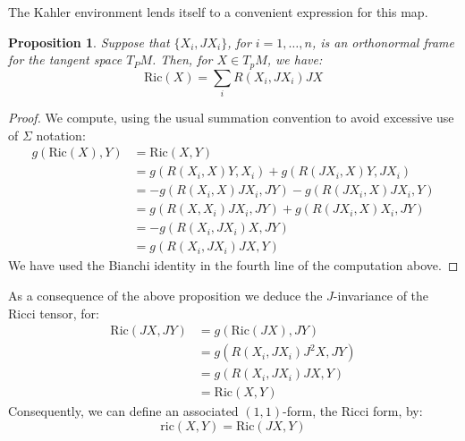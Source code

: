 \documentclass[11pt]{amsart}
\newtheorem{prop}[subsection]{Proposition}
\theoremstyle{definition}
\def \Ric{ \text{Ric} }
\def \ric{ \text{ric} }
\begin{document}
The Kahler environment lends itself to a convenient expression for this map.
%
\begin{prop} Suppose that $\{X_i, JX_i\}$, for $i=1,\ldots,n$, is an orthonormal frame for the tangent space $T_P M$.  Then, for $X \in T_p M$, we have:
$$ \Ric (X) = \sum_i R(X_i, JX_i) JX $$
\end{prop}
%
\begin{proof}
We compute, using the usual summation convention to avoid excessive use of $\Sigma$ notation:
%
\begin{align*}
g( \Ric(X), Y ) &= \Ric(X,Y) \\
&= g( R ( X_i, X ) Y, X_i ) + g( R ( J X_i, X ) Y, J X_i ) \\
&= - g( R( X_i, X ) J X_i, J Y ) - g( R( J X_i, X )J X_i, Y ) \\
&= g( R( X, X_i ) J X_i, J Y ) + g( R( J X_i, X ) X_i, JY ) \\
&= - g( R( X_i, J X_i ) X, JY ) \\
&= g( R( X_i, J X_i ) JX, Y )
\end{align*}
%
We have used the Bianchi identity in the fourth line of the computation above. 
%
\end{proof}
%
As a consequence of the above proposition we deduce the $J$-invariance of the Ricci tensor, for:
%
\begin{align*}
\Ric( JX, JY ) &= g( \Ric( JX ), JY ) \\
&= g( R( X_i, J X_i ) J^2 X, JY ) \\
&= g( R(X_i, J X_i ) JX, Y ) \\
&= \Ric( X, Y )
\end{align*}
%
Consequently, we can define an associated $(1,1)$-form, the Ricci form, by:
%
$$ \ric(X,Y) = \Ric(JX, Y)$$
\end{document}
